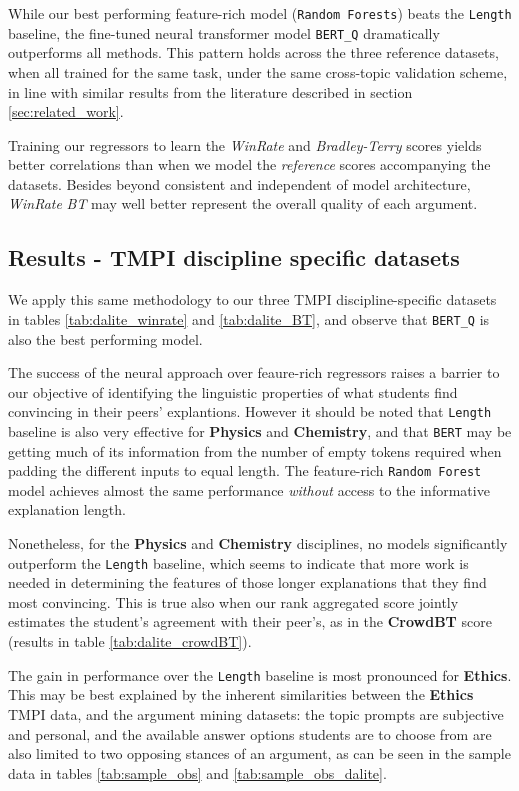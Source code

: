 \documentclass[notitlepage,12pt]{jedm}
\begin{document}
While our best performing feature-rich model (\verb|Random Forests|) beats the 
\verb|Length| baseline, the fine-tuned neural transformer model \verb|BERT_Q| 
dramatically outperforms all methods.
This pattern holds across the three reference datasets, when all trained for 
the same task, under the same cross-topic validation scheme, in line with 
similar results from the literature described in section \ref{sec:related_work}.

Training our regressors to learn the \textit{WinRate}  and 
\textit{Bradley-Terry} scores yields better correlations than when we model the 
\textit{reference} scores accompanying the datasets.
Besides beyond consistent and independent of model architecture, 
\textit{WinRate} \textit{BT} may well better represent the overall quality of 
each argument.

\subsection{Results - TMPI discipline specific datasets}
We apply this same methodology to our three TMPI discipline-specific datasets 
in tables \ref{tab:dalite_winrate} and \ref{tab:dalite_BT}, and observe that 
\verb|BERT_Q| is also the best performing model.

The success of the neural approach over feaure-rich regressors raises a barrier 
to our objective of identifying the linguistic properties of what students find 
convincing in their peers' explantions.
However it should be noted that \verb|Length| baseline is also very effective 
for \textbf{Physics} and \textbf{Chemistry}, and that \verb|BERT| may be 
getting much of its information from the number of empty tokens required when 
padding the different inputs to equal length.
The feature-rich \verb|Random Forest| model achieves almost the same 
performance \textit{without} access to the informative explanation length.

Nonetheless, for the \textbf{Physics} and \textbf{Chemistry} disciplines, no 
models significantly outperform the \verb|Length| baseline, which seems to 
indicate that more work is needed in determining the features of those longer 
explanations that they find most convincing.
This is true also when our rank aggregated score jointly estimates the 
student's agreement with their peer's, as in the \textbf{CrowdBT} score 
(results in table \ref{tab:dalite_crowdBT}).

The gain in performance over the \verb|Length| baseline is most pronounced for 
\textbf{Ethics}.
This may be best explained by the inherent similarities between the 
\textbf{Ethics} TMPI data, and the argument mining datasets: the topic prompts 
are subjective and personal, and the available answer options students are to 
choose from are also limited to two opposing stances of an argument, as can be 
seen in the sample data in tables \ref{tab:sample_obs} and 
\ref{tab:sample_obs_dalite}. 
\end{document}
